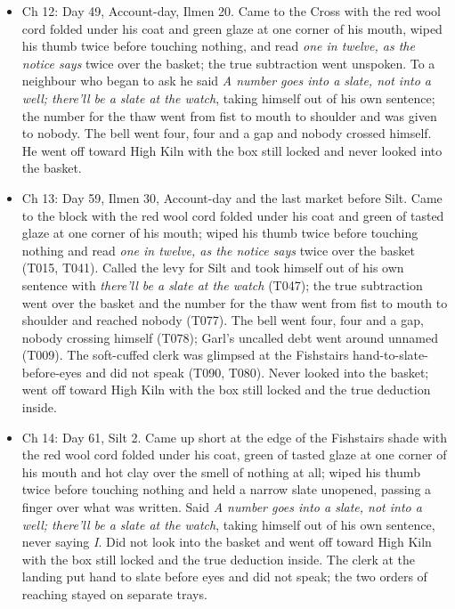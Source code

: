 \documentclass{design/chronicle}
\begin{document}
{\begin{itemize}[leftmargin=1.4em,itemsep=1pt,topsep=3pt,parsep=0pt]
\item Ch 12: Day 49, Account-day, Ilmen 20. Came to the Cross with the red wool cord folded under his coat and green glaze at one corner of his mouth, wiped his thumb twice before touching nothing, and read \emph{one in twelve, as the notice says} twice over the basket; the true subtraction went unspoken. To a neighbour who began to ask he said \emph{A number goes into a slate, not into a well; there’ll be a slate at the watch}, taking himself out of his own sentence; the number for the thaw went from fist to mouth to shoulder and was given to nobody. The bell went four, four and a gap and nobody crossed himself. He went off toward High Kiln with the box still locked and never looked into the basket.

\end{itemize}

\begin{itemize}[leftmargin=1.4em,itemsep=1pt,topsep=3pt,parsep=0pt]

\item Ch 13: Day 59, Ilmen 30, Account-day and the last market before Silt. Came to the block with the red wool cord folded under his coat and green of tasted glaze at one corner of his mouth; wiped his thumb twice before touching nothing and read \emph{one in twelve, as the notice says} twice over the basket (T015, T041). Called the levy for Silt and took himself out of his own sentence with \emph{there’ll be a slate at the watch} (T047); the true subtraction went over the basket and the number for the thaw went from fist to mouth to shoulder and reached nobody (T077). The bell went four, four and a gap, nobody crossing himself (T078); Garl’s uncalled debt went around unnamed (T009). The soft-cuffed clerk was glimpsed at the Fishstairs hand-to-slate-before-eyes and did not speak (T090, T080). Never looked into the basket; went off toward High Kiln with the box still locked and the true deduction inside.

\end{itemize}

\begin{itemize}[leftmargin=1.4em,itemsep=1pt,topsep=3pt,parsep=0pt]

\item Ch 14: Day 61, Silt 2. Came up short at the edge of the Fishstairs shade with the red wool cord folded under his coat, green of tasted glaze at one corner of his mouth and hot clay over the smell of nothing at all; wiped his thumb twice before touching nothing and held a narrow slate unopened, passing a finger over what was written. Said \emph{A number goes into a slate, not into a well; there’ll be a slate at the watch}, taking himself out of his own sentence, never saying \emph{I}. Did not look into the basket and went off toward High Kiln with the box still locked and the true deduction inside. The clerk at the landing put hand to slate before eyes and did not speak; the two orders of reaching stayed on separate trays.


\end{itemize}}
\end{document}
